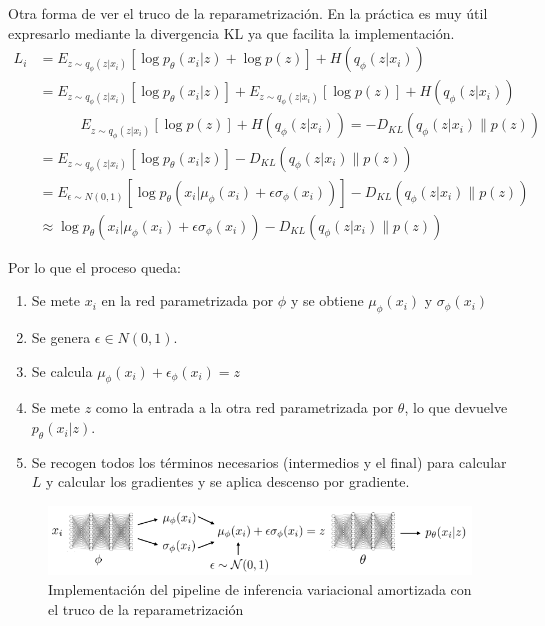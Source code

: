 Otra forma de ver el truco de la reparametrización. En la práctica es muy útil expresarlo
mediante la divergencia KL ya que facilita la implementación.
\begin{align}
L _ { i } &= E _ { z \sim q _ { \phi } ( z | x _ { i } ) } [ \operatorname { log } p _ { \theta } (
x _ { i } | z ) + \operatorname { log } p ( z ) ] + H ( q _ { \phi } ( z | x _ { i } ) )\\
&= E _ { z \sim q _ { \phi } ( z | x _ { i } ) } [ \operatorname { log } p _ { \theta } ( x _ { i }
| z ) ] + E _ { z \sim q _ { \phi } ( z | x _ { i } ) } [ \operatorname { log } p ( z ) ] + H ( q
_ { \phi } ( z | x _ { i } ) )\\
&\quad\quad\quad E _ { z \sim q _ { \phi } ( z | x _ { i } ) } [ \operatorname { log } p ( z ) ] + H ( q _ { \phi }
( z | x _ { i } ) )= - D _ { KL } ( q _ { \phi } ( z | x _ { i } ) \| p ( z ) )\\
&= E _ { z \sim q _ { \phi } ( z | x _ { i } ) } [ \operatorname { log } p _ { \theta } ( x _ { i }
| z ) ] - D _ { KL } ( q _ { \phi } ( z | x _ { i } ) \| p ( z ) )\\
&= E _ { \epsilon \sim N ( 0,1 ) } [ \operatorname { log } p _ { \theta } ( x _ { i } | \mu _ {
\phi } ( x _ { i } ) + \epsilon \sigma _ { \phi } ( x _ { i } ) ) ] - D _ { KL } ( q _ { \phi } (
z | x _ { i } ) \| p ( z ) )\\
&\approx \operatorname { log } p _ { \theta } ( x _ { i } | \mu _ { \phi } ( x _ { i } ) + \epsilon \sigma _ { \phi } ( x _ { i } ) ) - D _ { KL } ( q _ { \phi } ( z | x _ { i } ) \| p ( z ) )
\end{align}

Por lo que el proceso queda:
\begin{enumerate}
    \item Se mete $x_i$ en la red parametrizada por $\phi$ y se obtiene $\mu_\phi(x_i)$ y
        $\sigma_\phi(x_i)$ 
    \item Se genera $\epsilon \in N(0,1)$.
    \item Se calcula $\mu_\phi(x_i)+\epsilon_\phi(x_i)=z$
    \item Se mete $z$ como la entrada a la otra red parametrizada por $\theta$, lo que
        devuelve $p_\theta(x_i|z)$.
    \item Se recogen todos los términos necesarios (intermedios y el final) para calcular $L$ y
        calcular los gradientes y se aplica descenso por gradiente.
\end{enumerate}

\begin{figure}[htpb]
	\centering
	\includegraphics[width=0.8\linewidth]{figures/2020-07-01-233216_757x124_scrot.png}
	\caption{Implementación del pipeline de inferencia variacional amortizada con el truco de la reparametrización}
	\label{fig:pipeline_reparametrizacion}
\end{figure}

